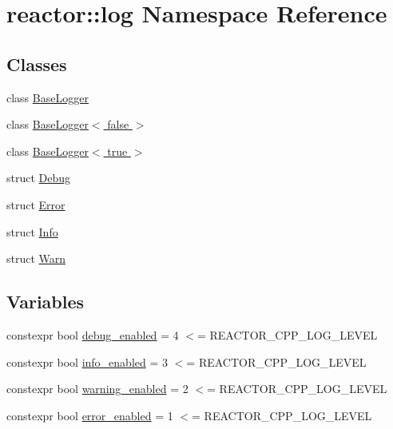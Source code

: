\hypertarget{namespacereactor_1_1log}{}\section{reactor\+:\+:log Namespace Reference}
\label{namespacereactor_1_1log}
\subsection*{Classes}
\begin{DoxyCompactItemize}
\item 
class \hyperlink{classreactor_1_1log_1_1BaseLogger}{Base\+Logger}
\item 
class \hyperlink{classreactor_1_1log_1_1BaseLogger_3_01false_01_4}{Base\+Logger$<$ false $>$}
\item 
class \hyperlink{classreactor_1_1log_1_1BaseLogger_3_01true_01_4}{Base\+Logger$<$ true $>$}
\item 
struct \hyperlink{structreactor_1_1log_1_1Debug}{Debug}
\item 
struct \hyperlink{structreactor_1_1log_1_1Error}{Error}
\item 
struct \hyperlink{structreactor_1_1log_1_1Info}{Info}
\item 
struct \hyperlink{structreactor_1_1log_1_1Warn}{Warn}
\end{DoxyCompactItemize}
\subsection*{Variables}
\begin{DoxyCompactItemize}
\item 
constexpr bool \hyperlink{namespacereactor_1_1log_a1391126b1838b59126c9e9d1158a7f55}{debug\+\_\+enabled} = 4 $<$= R\+E\+A\+C\+T\+O\+R\+\_\+\+C\+P\+P\+\_\+\+L\+O\+G\+\_\+\+L\+E\+V\+EL
\item 
constexpr bool \hyperlink{namespacereactor_1_1log_a3eb2fa07d2ccd17506a05aa3f2f14b2d}{info\+\_\+enabled} = 3 $<$= R\+E\+A\+C\+T\+O\+R\+\_\+\+C\+P\+P\+\_\+\+L\+O\+G\+\_\+\+L\+E\+V\+EL
\item 
constexpr bool \hyperlink{namespacereactor_1_1log_a88a5f4b17305527201bcb473d079d49d}{warning\+\_\+enabled} = 2 $<$= R\+E\+A\+C\+T\+O\+R\+\_\+\+C\+P\+P\+\_\+\+L\+O\+G\+\_\+\+L\+E\+V\+EL
\item 
constexpr bool \hyperlink{namespacereactor_1_1log_a1985bfad8d1269e6d3d5e119ce846eef}{error\+\_\+enabled} = 1 $<$= R\+E\+A\+C\+T\+O\+R\+\_\+\+C\+P\+P\+\_\+\+L\+O\+G\+\_\+\+L\+E\+V\+EL
\end{DoxyCompactItemize}


